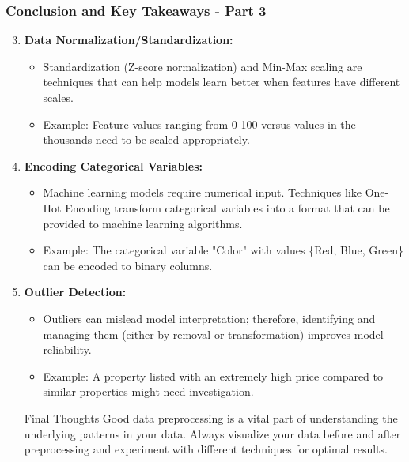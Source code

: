 \documentclass[aspectratio=169]{beamer}
\begin{document}
\begin{frame}[fragile]
    \frametitle{Conclusion and Key Takeaways - Part 3}
    \begin{enumerate}
        \setcounter{enumi}{2} %
        \item \textbf{Data Normalization/Standardization:}
        \begin{itemize}
            \item Standardization (Z-score normalization) and Min-Max scaling are techniques that can help models learn better when features have different scales.
            \item Example: Feature values ranging from 0-100 versus values in the thousands need to be scaled appropriately.
        \end{itemize}
        
        \item \textbf{Encoding Categorical Variables:}
        \begin{itemize}
            \item Machine learning models require numerical input. Techniques like One-Hot Encoding transform categorical variables into a format that can be provided to machine learning algorithms.
            \item Example: The categorical variable "Color" with values \{Red, Blue, Green\} can be encoded to binary columns.
        \end{itemize}
        
        \item \textbf{Outlier Detection:}
        \begin{itemize}
            \item Outliers can mislead model interpretation; therefore, identifying and managing them (either by removal or transformation) improves model reliability.
            \item Example: A property listed with an extremely high price compared to similar properties might need investigation.
        \end{itemize}
        
        \begin{block}{Final Thoughts}
            Good data preprocessing is a vital part of understanding the underlying patterns in your data. Always visualize your data before and after preprocessing and experiment with different techniques for optimal results.
        \end{block}
    \end{enumerate}
\end{frame}
\end{document}
